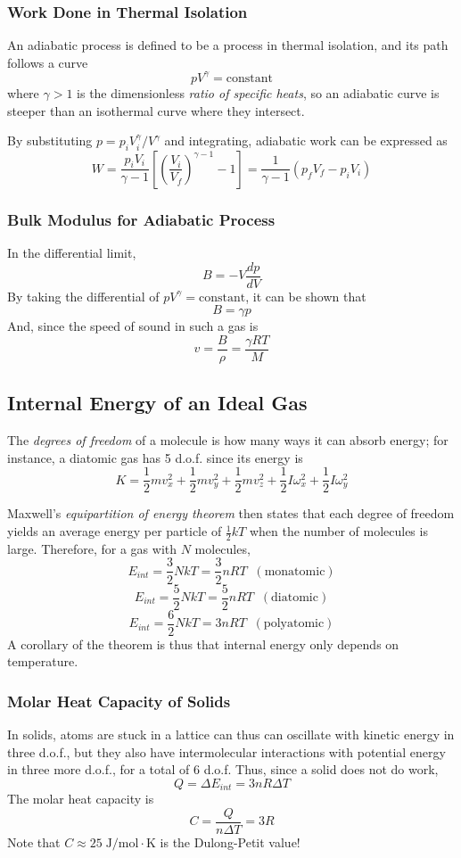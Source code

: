 \documentclass[../PhysicsFormulae.tex]{subfiles}
\begin{document}
\subsubsection{Work Done in Thermal Isolation}
An adiabatic process is defined to be a process in thermal isolation, and its path follows a curve 
\[ pV^{\gamma} = \mathrm{constant} \]
where $\gamma > 1$ is the dimensionless \textit{ratio of specific heats}, so an adiabatic curve is steeper than an isothermal curve where they intersect. \bigskip

By substituting $p = p_i V_i^{\gamma} /V^{\gamma}$ and integrating, adiabatic work can be expressed as 
\[ W = \frac{p_i V_i}{\gamma - 1} \left[ \left(\frac{V_i}{V_f}\right)^{\gamma - 1} - 1 \right] = \frac{1}{\gamma - 1} (p_f V_f - p_i V_i) \]

\subsubsection{Bulk Modulus for Adiabatic Process}
In the differential limit, 
\[ B = -V\frac{dp}{dV} \]
By taking the differential of $pV^{\gamma} = \mathrm{constant}$, it can be shown that 
\[ B = \gamma p \]
And, since the speed of sound in such a gas is
\[ v = \frac{B}{\rho} = \frac{\gamma RT}{M} \]

\subsection{Internal Energy of an Ideal Gas}
The \textit{degrees of freedom} of a molecule is how many ways it can absorb energy; for instance, a diatomic gas has 5 d.o.f. since its energy is 
\[ K = \frac{1}{2}mv_x^2 + \frac{1}{2}mv_y^2 + \frac{1}{2}mv_z^2 + \frac{1}{2} I\omega_x^2 + \frac{1}{2} I \omega_y^2 \]

Maxwell's \textit{equipartition of energy theorem} then states that each degree of freedom yields an average energy per particle of $\frac{1}{2}kT$ when the number of molecules is large. Therefore, for a gas with $N$ molecules,
\[ E_{int} = \frac{3}{2}NkT = \frac{3}{2}nRT \;\; (\mathrm{monatomic}) \]
\[ E_{int} = \frac{5}{2}NkT = \frac{5}{2}nRT \;\; (\mathrm{diatomic}) \]
\[ E_{int} = \frac{6}{2}NkT = 3nRT \; \; (\mathrm{polyatomic}) \]
A corollary of the theorem is thus that internal energy only depends on temperature. 

\subsubsection{Molar Heat Capacity of Solids}
In solids, atoms are stuck in a lattice can thus can oscillate with kinetic energy in three d.o.f., but they also have intermolecular interactions with potential energy in three more d.o.f., for a total of 6 d.o.f. Thus, since a solid does not do work, 
\[ Q = \Delta E_{int} = 3 nR\Delta T \]
The molar heat capacity is 
\[ C = \frac{Q}{n \Delta T} = 3R \]
Note that $C \approx 25 \; \mathrm{J/mol \cdot K}$ is the Dulong-Petit value!
\end{document}
